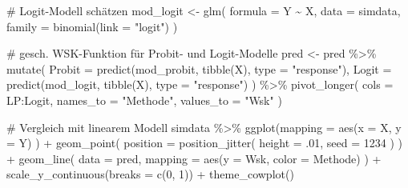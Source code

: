\documentclass[
  a4paper,
  DIV=11,
  oneside]{scrreprt}
\newenvironment{Shaded}{\begin{snugshade}}{\end{snugshade}}
\newcommand{\AttributeTok}[1]{\textcolor[rgb]{0.40,0.45,0.13}{#1}}
\newcommand{\CommentTok}[1]{\textcolor[rgb]{0.37,0.37,0.37}{#1}}
\newcommand{\DecValTok}[1]{\textcolor[rgb]{0.68,0.00,0.00}{#1}}
\newcommand{\FunctionTok}[1]{\textcolor[rgb]{0.28,0.35,0.67}{#1}}
\newcommand{\NormalTok}[1]{\textcolor[rgb]{0.00,0.23,0.31}{#1}}
\newcommand{\OtherTok}[1]{\textcolor[rgb]{0.00,0.23,0.31}{#1}}
\newcommand{\SpecialCharTok}[1]{\textcolor[rgb]{0.37,0.37,0.37}{#1}}
\newcommand{\StringTok}[1]{\textcolor[rgb]{0.13,0.47,0.30}{#1}}
\begin{document}
\begin{Shaded}
\begin{Highlighting}[]
\CommentTok{\# Logit{-}Modell schätzen}
\NormalTok{mod\_logit }\OtherTok{\textless{}{-}} \FunctionTok{glm}\NormalTok{(}
  \AttributeTok{formula =}\NormalTok{ Y }\SpecialCharTok{\textasciitilde{}}\NormalTok{ X,}
  \AttributeTok{data =}\NormalTok{ simdata, }
  \AttributeTok{family =} \FunctionTok{binomial}\NormalTok{(}\AttributeTok{link =} \StringTok{"logit"}\NormalTok{)}
\NormalTok{)}
\end{Highlighting}
\end{Shaded}

\begin{Shaded}
\begin{Highlighting}[]
\CommentTok{\# gesch. WSK{-}Funktion für Probit{-} und Logit{-}Modelle}
\NormalTok{pred }\OtherTok{\textless{}{-}}\NormalTok{ pred }\SpecialCharTok{\%\textgreater{}\%}
  \FunctionTok{mutate}\NormalTok{(}
    \AttributeTok{Probit =} \FunctionTok{predict}\NormalTok{(mod\_probit, }\FunctionTok{tibble}\NormalTok{(X), }\AttributeTok{type =} \StringTok{"response"}\NormalTok{),}
    \AttributeTok{Logit =} \FunctionTok{predict}\NormalTok{(mod\_logit, }\FunctionTok{tibble}\NormalTok{(X), }\AttributeTok{type =} \StringTok{"response"}\NormalTok{)}
\NormalTok{  ) }\SpecialCharTok{\%\textgreater{}\%}
  \FunctionTok{pivot\_longer}\NormalTok{(}
  \AttributeTok{cols =}\NormalTok{ LP}\SpecialCharTok{:}\NormalTok{Logit, }
  \AttributeTok{names\_to =} \StringTok{"Methode"}\NormalTok{, }
  \AttributeTok{values\_to =} \StringTok{"Wsk"}
\NormalTok{)}
\end{Highlighting}
\end{Shaded}

\begin{Shaded}
\begin{Highlighting}[]
\CommentTok{\# Vergleich mit linearem Modell}
\NormalTok{simdata }\SpecialCharTok{\%\textgreater{}\%}
  \FunctionTok{ggplot}\NormalTok{(}\AttributeTok{mapping =} \FunctionTok{aes}\NormalTok{(}\AttributeTok{x =}\NormalTok{ X, }\AttributeTok{y =}\NormalTok{ Y) ) }\SpecialCharTok{+}
  \FunctionTok{geom\_point}\NormalTok{(}
    \AttributeTok{position =} \FunctionTok{position\_jitter}\NormalTok{(}
      \AttributeTok{height =}\NormalTok{ .}\DecValTok{01}\NormalTok{, }
      \AttributeTok{seed =} \DecValTok{1234}
\NormalTok{    )}
\NormalTok{  ) }\SpecialCharTok{+}
  \FunctionTok{geom\_line}\NormalTok{(}
    \AttributeTok{data =}\NormalTok{ pred, }
    \AttributeTok{mapping =} \FunctionTok{aes}\NormalTok{(}\AttributeTok{y =}\NormalTok{ Wsk, }\AttributeTok{color =}\NormalTok{ Methode)}
\NormalTok{  ) }\SpecialCharTok{+}
  \FunctionTok{scale\_y\_continuous}\NormalTok{(}\AttributeTok{breaks =} \FunctionTok{c}\NormalTok{(}\DecValTok{0}\NormalTok{, }\DecValTok{1}\NormalTok{)) }\SpecialCharTok{+}
  \FunctionTok{theme\_cowplot}\NormalTok{()}
\end{Highlighting}
\end{Shaded}
\end{document}
